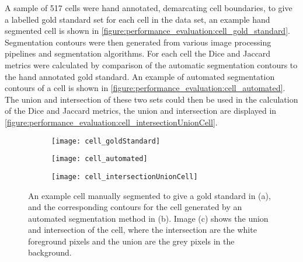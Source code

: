 A sample of 517 cells were hand annotated, demarcating cell boundaries, to give a labelled gold standard set for each cell in the data set, an example hand segmented cell is shown in \autoref{figure:performance_evaluation:cell_gold_standard}. Segmentation contours were then generated from various image processing pipelines and segmentation algorithms. For each cell the Dice and Jaccard metrics were calculated by comparison of the automatic segmentation contours to the hand annotated gold standard. An example of automated segmentation contours of a cell is shown in \autoref{figure:performance_evaluation:cell_automated}. The union and intersection of these two sets could then be used in the calculation of the Dice and Jaccard metrics, the union and intersection are displayed in \autoref{figure:performance_evaluation:cell_intersectionUnionCell}.

\begin{figure}[htbp]\centering
	\begin{subfigure}[b]{0.32\linewidth}
		\centering
		\texttt{[image: cell\_goldStandard]}
		\caption{}
		\label{figure:performance_evaluation:cell_gold_standard}
		\vspace{1ex}
	\end{subfigure}
	\begin{subfigure}[b]{0.32\linewidth}
		\centering
		\texttt{[image: cell\_automated]}
		\caption{}
		\label{figure:performance_evaluation:cell_automated}
		\vspace{1ex}
	\end{subfigure}
	\begin{subfigure}[b]{0.32\linewidth}
		\centering
		\texttt{[image: cell\_intersectionUnionCell]}
		\caption{}
		\label{figure:performance_evaluation:cell_intersectionUnionCell}
		\vspace{1ex}
	\end{subfigure}
\caption[Example cell pixel sets gold standard, automated segmentation, and union and intersection]{An example cell manually segmented to give a gold standard in (a), and the corresponding contours for the cell generated by an automated segmentation method in (b). Image (c) shows the union and intersection of the cell, where the intersection are the white foreground pixels and the union are the grey pixels in the background.}
\label{figure:performance_evaluation:cell}
\end{figure}

